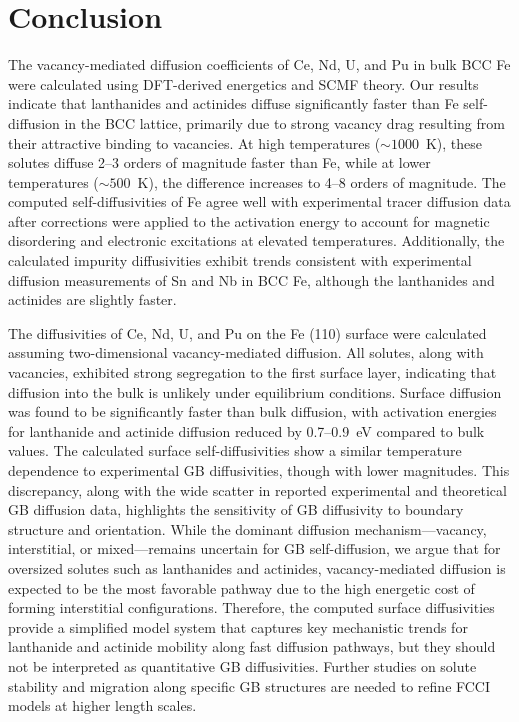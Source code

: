 \documentclass[preprint,12pt]{elsarticle}
\begin{document}
\FloatBarrier

\section{Conclusion}
\noindent The vacancy-mediated diffusion coefficients of Ce, Nd, U, and Pu in bulk BCC Fe were calculated using DFT-derived energetics and SCMF theory. Our results indicate that lanthanides and actinides diffuse significantly faster than Fe self-diffusion in the BCC lattice, primarily due to strong vacancy drag resulting from their attractive binding to vacancies. At high temperatures ($\sim1000$~K), these solutes diffuse 2–3 orders of magnitude faster than Fe, while at lower temperatures ($\sim500$~K), the difference increases to 4–8 orders of magnitude.
The computed self-diffusivities of Fe agree well with experimental tracer diffusion data after corrections were applied to the activation energy to account for magnetic disordering and electronic excitations at elevated temperatures. Additionally, the calculated impurity diffusivities exhibit trends consistent with experimental diffusion measurements of Sn and Nb in BCC Fe, although the lanthanides and actinides are slightly faster.

The diffusivities of Ce, Nd, U, and Pu on the Fe (110) surface were calculated assuming two-dimensional vacancy-mediated diffusion. All solutes, along with vacancies, exhibited strong segregation to the first surface layer, indicating that diffusion into the bulk is unlikely under equilibrium conditions. 
Surface diffusion was found to be significantly faster than bulk diffusion, with activation energies for lanthanide and actinide diffusion reduced by 0.7–0.9~eV compared to bulk values. The calculated surface self-diffusivities show a similar temperature dependence to experimental GB diffusivities, though with lower magnitudes. This discrepancy, along with the wide scatter in reported experimental and theoretical GB diffusion data, highlights the sensitivity of GB diffusivity to boundary structure and orientation. 
While the dominant diffusion mechanism—vacancy, interstitial, or mixed—remains uncertain for GB self-diffusion, we argue that for oversized solutes such as lanthanides and actinides, vacancy-mediated diffusion is expected to be the most favorable pathway due to the high energetic cost of forming interstitial configurations. 
Therefore, the computed surface diffusivities provide a simplified model system that captures key mechanistic trends for lanthanide and actinide mobility along fast diffusion pathways, but they should not be interpreted as quantitative GB diffusivities. Further studies on solute stability and migration along specific GB structures are needed to refine FCCI models at higher length scales.
\end{document}
